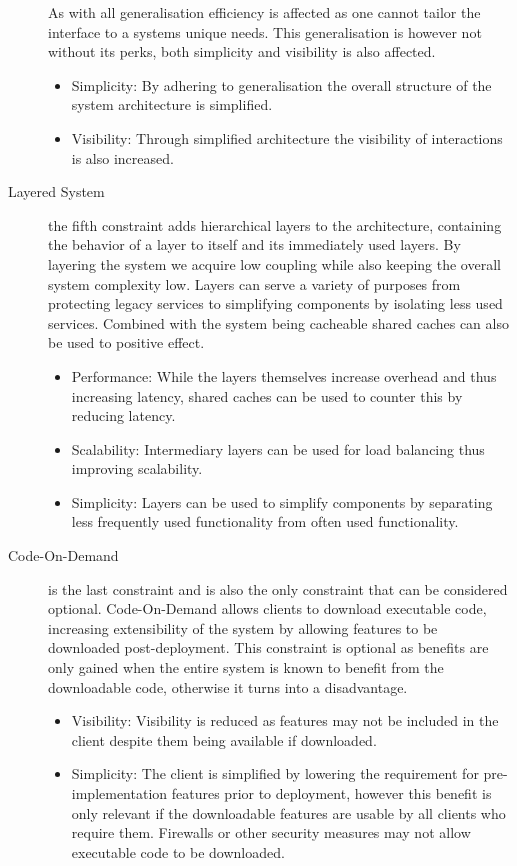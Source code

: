 \begin{description}
    As with all generalisation efficiency is affected as one cannot tailor the interface to a systems unique needs.
    This generalisation is however not without its perks, both simplicity and visibility is also affected.
    \begin{itemize}
        \item Simplicity: By adhering to generalisation the overall structure of the system architecture is simplified.
        \item Visibility: Through simplified architecture the visibility of interactions is also increased.
    \end{itemize}
    \item [Layered System] the fifth constraint adds hierarchical layers to the architecture, containing the behavior of a layer to itself and its immediately used layers.
    By layering the system we acquire low coupling while also keeping the overall system complexity low.
    Layers can serve a variety of purposes from protecting legacy services to simplifying components by isolating less used services.
    Combined with the system being cacheable shared caches can also be used to positive effect.
    \begin{itemize}
        \item Performance: While the layers themselves increase overhead and thus increasing latency, shared caches can be used to counter this by reducing latency.
        \item Scalability: Intermediary layers can be used for load balancing thus improving scalability.
        \item Simplicity: Layers can be used to simplify components by separating less frequently used functionality from often used functionality.
    \end{itemize} 
    \item [Code-On-Demand] is the last constraint and is also the only constraint that can be considered optional.
    Code-On-Demand allows clients to download executable code, increasing extensibility of the system by allowing features to be downloaded post-deployment.
    This constraint is optional as benefits are only gained when the entire system is known to benefit from the downloadable code, otherwise it turns into a disadvantage.
    \begin{itemize}
        \item Visibility: Visibility is reduced as features may not be included in the client despite them being available if downloaded.
        \item Simplicity: The client is simplified by lowering the requirement for pre-implementation features prior to deployment, however this benefit is only relevant if the downloadable features are usable by all clients who require them.
        Firewalls or other security measures may not allow executable code to be downloaded.
    \end{itemize} 
\end{description}